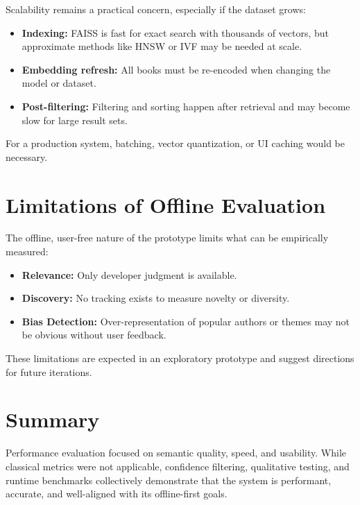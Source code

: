 Scalability remains a practical concern, especially if the dataset grows:

\begin{itemize}
    \item \textbf{Indexing:} FAISS is fast for exact search with thousands of vectors, but approximate methods like HNSW or IVF may be needed at scale.
    \item \textbf{Embedding refresh:} All books must be re-encoded when changing the model or dataset.
    \item \textbf{Post-filtering:} Filtering and sorting happen after retrieval and may become slow for large result sets.
\end{itemize}

For a production system, batching, vector quantization, or UI caching would be necessary.

\section{Limitations of Offline Evaluation}
\label{sec:limitations}

The offline, user-free nature of the prototype limits what can be empirically measured:

\begin{itemize}
    \item \textbf{Relevance:} Only developer judgment is available.
    \item \textbf{Discovery:} No tracking exists to measure novelty or diversity.
    \item \textbf{Bias Detection:} Over-representation of popular authors or themes may not be obvious without user feedback.
\end{itemize}

These limitations are expected in an exploratory prototype and suggest directions for future iterations.

\section{Summary}
\label{sec:performance-summary}

Performance evaluation focused on semantic quality, speed, and usability. While classical metrics were not applicable, confidence filtering, qualitative testing, and runtime benchmarks collectively demonstrate that the system is performant, accurate, and well-aligned with its offline-first goals.
